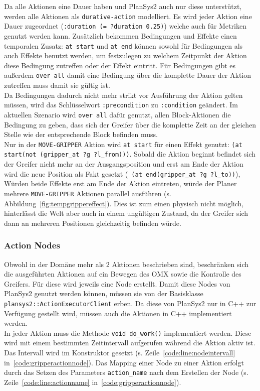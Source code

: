 Da alle Aktionen eine Dauer haben und \ac{PlanSys2} auch nur diese unterstützt, werden alle Aktionen als \verb|durative-action| modelliert.
Es wird jeder Aktion eine Dauer zugeordnet (\verb|:duration (= ?duration 0.25)|) welche auch für Metriken genutzt werden kann.
Zusätzlich bekommen Bedingungen und Effekte einen temporalen Zusatz: \verb|at start| und \verb|at end| können sowohl für Bedingungen als auch Effekte benutzt werden, um festzulegen zu welchem Zeitpunkt der Aktion diese Bedingung zutreffen oder der Effekt eintritt.
Für Bedingungen gibt es außerdem \verb|over all| damit eine Bedingung über die komplette Dauer der Aktion zutreffen muss damit sie gültig ist.\\
Da Bedingungen dadurch nicht mehr strikt vor Ausführung der Aktion gelten müssen, wird das Schlüsselwort \verb|:precondition| zu \verb|:condition| geändert.
Im aktuellen Szenario wird \verb|over all| dafür genutzt, allen Block-Aktionen die Bedingung zu geben, dass sich der Greifer über die komplette Zeit an der gleichen Stelle wie der entsprechende Block befinden muss.\\
Nur in der \verb|MOVE-GRIPPER| Aktion wird \verb|at start| für einen Effekt genutzt: \verb|(at start(not (gripper_at ?g ?l_from)))|.
Sobald die Aktion beginnt befindet sich der Greifer nicht mehr an der Ausgangsposition und erst am Ende der Aktion wird die neue Position als Fakt gesetzt (\verb| (at end(gripper_at ?g ?l_to))|), Würden beide Effekte erst am Ende der Aktion eintreten, würde der Planer mehrere \verb|MOVE-GRIPPER| Aktionen parallel ausführen (s. Abbildung~\ref{fig:tempgrippereffect}).
Dies ist zum einen physisch nicht möglich, hinterlässt die Welt aber auch in einem ungültigen Zustand, da der Greifer sich dann an mehreren Positionen gleichzeitig befinden würde.



\subsubsection{Action Nodes}
Obwohl in der Domäne mehr als 2 Aktionen beschrieben sind, beschränken sich die ausgeführten Aktionen auf ein Bewegen des OMX sowie die Kontrolle des Greifers.
Für diese wird jeweils eine Node erstellt.
Damit diese Nodes von \ac{PlanSys2} genutzt werden können, müssen sie von der Basisklasse \verb|plansys2::ActionExecutorClient| erben.
Da diese von \ac{PlanSys2} nur in C++ zur Verfügung gestellt wird, müssen auch die Aktionen in C++ implementiert werden.\\
In jeder Aktion muss die Methode \verb|void do_work()| implementiert werden.
Diese wird mit einem bestimmten Zeitintervall aufgerufen während die Aktion aktiv ist.
Das Intervall wird im Konstruktor gesetzt (s. Zeile~\ref{code:line:nodeintervall} in~\ref{code:gripperactionnode}).
Das Mapping einer Node zu einer Aktion erfolgt durch das Setzen des Parameters \verb|action_name| nach dem Erstellen der Node (s. Zeile~\ref{code:line:actionname} in~\ref{code:gripperactionnode}).


